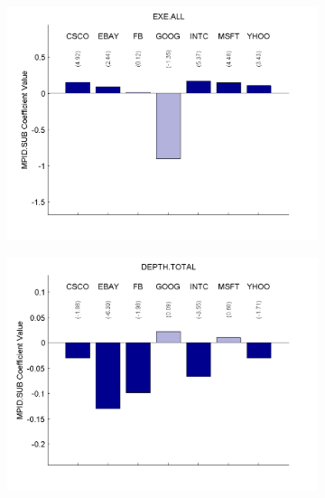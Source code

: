 \documentclass{article}
\begin{document}
\begin{figure}[htp!]
\begin{subfigure}{0.31\textwidth}
\includegraphics[width=\linewidth]{docs/TMBR_Regression_Ratio_30sec_16_MPID_SUB_1MPIDLags_5DepVarLags.pdf}
\end{subfigure}
\begin{subfigure}{0.31\textwidth}
\includegraphics[width=\linewidth]{docs/TMBR_Regression_Ratio_30sec_21_MPID_SUB_1MPIDLags_5DepVarLags.pdf}
\end{subfigure}
\begin{subfigure}{0.31\textwidth}

\end{subfigure}
\end{figure}
\end{document}
